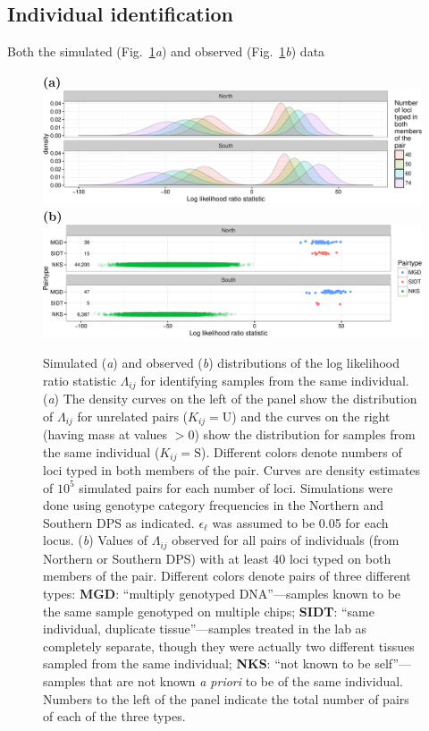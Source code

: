 \subsection{Individual identification}
Both the simulated (Fig.~\ref{fig:self-id}{\em a}) and observed (Fig.~\ref{fig:self-id}{\em b}) data 
\begin{figure}
{\bf (a)}\\
\includegraphics[width = \textwidth]{inputs/lambda_densities-crop.pdf}\\
{\bf (b)}\\
\includegraphics[width = \textwidth]{inputs/obs-self-id-logls-crop.pdf}
\caption{ Simulated ({\em a}) and observed ({\em b}) distributions of the log likelihood ratio 
statistic $\Lambda_{ij}$ for identifying samples from the same individual.  ({\em a}) The density curves on the 
left of the panel show the distribution of $\Lambda_{ij}$ for unrelated pairs (\ie $K_{ij} = \mathrm{U}$) and the 
curves on the right (having mass at values $>0$) show the distribution for samples from the same individual
($K_{ij} = \mathrm{S}$).  Different colors denote numbers of loci typed in both members of
the pair.  Curves are density estimates of $10^5$ simulated pairs for each number of loci. Simulations were done using
genotype category frequencies in the Northern and Southern DPS as indicated. $\epsilon_\ell$ was assumed to be 0.05 for
each locus. ({\em b}) Values of $\Lambda_{ij}$ observed for all pairs of individuals (from Northern or Southern DPS)
with at least 40 loci typed on both members of the pair. Different colors denote pairs of three different types: {\bf MGD}: 
``multiply genotyped DNA''---samples known to be the same sample genotyped on multiple chips; {\bf SIDT}: ``same
individual, duplicate tissue''---samples treated in the lab as completely separate, 
though they were actually two different tissues sampled from the same individual; 
{\bf NKS}: ``not known to be self''---samples that are not known {\em a priori} to 
be of the same individual. Numbers to the left of the panel indicate the total number of pairs of each of the 
three types.
\label{fig:self-id}}
\end{figure}
